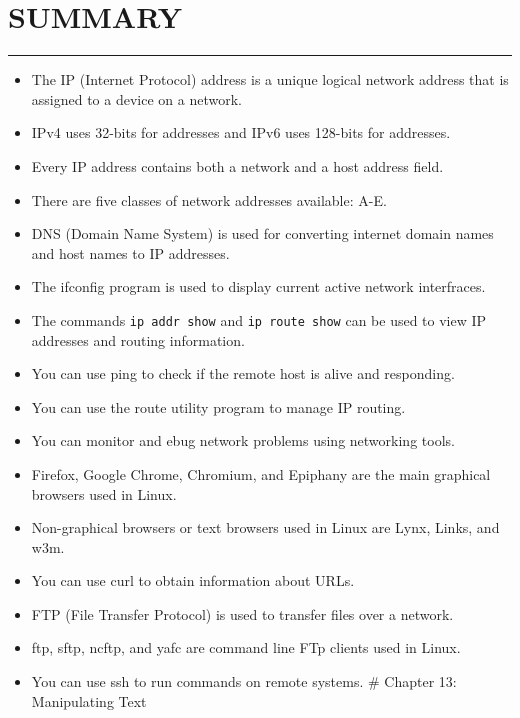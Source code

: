 \section{SUMMARY}\label{summary-10}

\begin{center}\rule{3in}{0.4pt}\end{center}

\begin{itemize}
\itemsep1pt\parskip0pt
\item
  The IP (Internet Protocol) address is a unique logical network address
  that is assigned to a device on a network.
\item
  IPv4 uses 32-bits for addresses and IPv6 uses 128-bits for addresses.
\item
  Every IP address contains both a network and a host address field.
\item
  There are five classes of network addresses available: A-E.
\item
  DNS (Domain Name System) is used for converting internet domain names
  and host names to IP addresses.
\item
  The ifconfig program is used to display current active network
  interfraces.
\item
  The commands \texttt{ip addr show} and \texttt{ip route show} can be
  used to view IP addresses and routing information.
\item
  You can use ping to check if the remote host is alive and responding.
\item
  You can use the route utility program to manage IP routing.
\item
  You can monitor and ebug network problems using networking tools.
\item
  Firefox, Google Chrome, Chromium, and Epiphany are the main graphical
  browsers used in Linux.
\item
  Non-graphical browsers or text browsers used in Linux are Lynx, Links,
  and w3m.
\item
  You can use curl to obtain information about URLs.
\item
  FTP (File Transfer Protocol) is used to transfer files over a network.
\item
  ftp, sftp, ncftp, and yafc are command line FTp clients used in Linux.
\item
  You can use ssh to run commands on remote systems. \# Chapter 13:
  Manipulating Text
\end{itemize}

